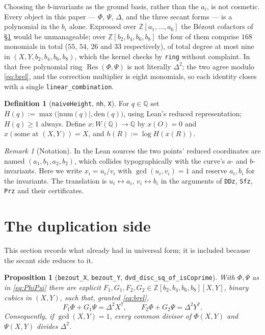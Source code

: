 \documentclass[11pt,reqno]{amsart}
\theoremstyle{plain}
\newtheorem{proposition}[theorem]{Proposition}
\theoremstyle{definition}
\newtheorem{definition}[theorem]{Definition}
\theoremstyle{remark}
\newtheorem{remark}[theorem]{Remark}
\DeclareRobustCommand{\lt}[1]{\texttt{#1}}
\newcommand{\nh}{H}
\DeclareMathOperator{\Res}{Res}
\begin{document}
Choosing the $b$-invariants as the ground basis, rather than the
$a_i$, is not cosmetic. Every object in this paper --- $\Phi$, $\Psi$,
$\Delta$, and the three secant forms --- is a polynomial in the $b_i$
alone. Expressed over $\mathbb{Z}[a_1,\dots,a_6]$ the B\'ezout
cofactors of \S\ref{sec:dup} would be unmanageable; over
$\mathbb{Z}[b_2,b_4,b_6,b_8]$ the four of them comprise $168$ monomials
in total ($55$, $54$, $26$ and $33$ respectively), of total degree at
most nine in $(X,Y,b_2,b_4,b_6,b_8)$, which the kernel checks by
\lt{ring} without complaint. In that free polynomial ring
$\Res(\Phi,\Psi)$ is not literally $\Delta^2$; the two agree modulo
\eqref{eq:brel}, and the correction multiplier is eight monomials, so
each identity closes with a single \lt{linear\_combination}.

\begin{definition}[\lt{naiveHeight}, \lt{nh}, \lt{X}]
For $q \in \mathbb{Q}$ set
$\nh(q) := \max\bigl(\lvert\mathrm{num}(q)\rvert, \mathrm{den}(q)\bigr)$,
using Lean's reduced representation; $\nh(q) \ge 1$ always. Define
$x \colon W(\mathbb{Q}) \to \mathbb{Q}$ by $x(O) = 0$ and
$x(\text{some at }(X,Y)) = X$, and $h(R) := \log \nh(x(R))$.
\end{definition}

\begin{remark}[Notation]\label{rem:notation}
In the Lean sources the two points' reduced coordinates are named
$(a_1,b_1,a_2,b_2)$, which collides typographically with the curve's
$a$- and $b$-invariants. Here we write $x_i = u_i/v_i$ with
$\gcd(u_i,v_i)=1$ and reserve $a_i, b_i$ for the invariants. The
translation is $u_i \leftrightarrow a_i$, $v_i \leftrightarrow b_i$ in
the arguments of \lt{DDz}, \lt{Sfz}, \lt{Prz} and their certificates.
\end{remark}

\section{The duplication side}\label{sec:dup}

This section records what \cite{MW} already had in universal form; it is
included because the secant side reduces to it.

\begin{proposition}[\lt{bezout\_X}, \lt{bezout\_Y},
\lt{dvd\_disc\_sq\_of\_isCoprime}]\label{prop:bez}
With $\Phi,\Psi$ as in \eqref{eq:PhiPsi} there are explicit
$F_1,G_1,F_2,G_2 \in \mathbb{Z}[b_2,b_4,b_6,b_8][X,Y]$, binary cubics in
$(X,Y)$, such that, granted \eqref{eq:brel},
\[
  F_1\Phi + G_1\Psi = \Delta^2 X^7, \qquad
  F_2\Phi + G_2\Psi = \Delta^2 Y^7 .
\]
Consequently, if $\gcd(X,Y) = 1$, every common divisor of $\Phi(X,Y)$
and $\Psi(X,Y)$ divides $\Delta^2$.
\end{proposition}
\end{document}
